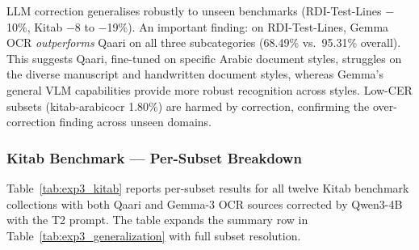 LLM correction generalises robustly to unseen benchmarks (RDI-Test-Lines $-$10\%,
Kitab $-$8 to $-$19\%).
An important finding: on RDI-Test-Lines, Gemma OCR \emph{outperforms}
Qaari on all three subcategories (68.49\% vs.\ 95.31\% overall). This
suggests Qaari, fine-tuned on specific Arabic document styles, struggles on
the diverse manuscript and handwritten document styles, whereas Gemma's
general VLM capabilities provide more robust recognition across styles.
Low-CER subsets (kitab-arabicocr 1.80\%) are harmed by correction,
confirming the over-correction finding across unseen domains.

\subsubsection*{Kitab Benchmark --- Per-Subset Breakdown}
\label{subsubsec:res_exp3_kitab}

Table~\ref{tab:exp3_kitab} reports per-subset results for all twelve Kitab
benchmark collections with both Qaari and Gemma-3 OCR sources corrected by
Qwen3-4B with the T2 prompt. The table expands the summary row in
Table~\ref{tab:exp3_generalization} with full subset resolution.

